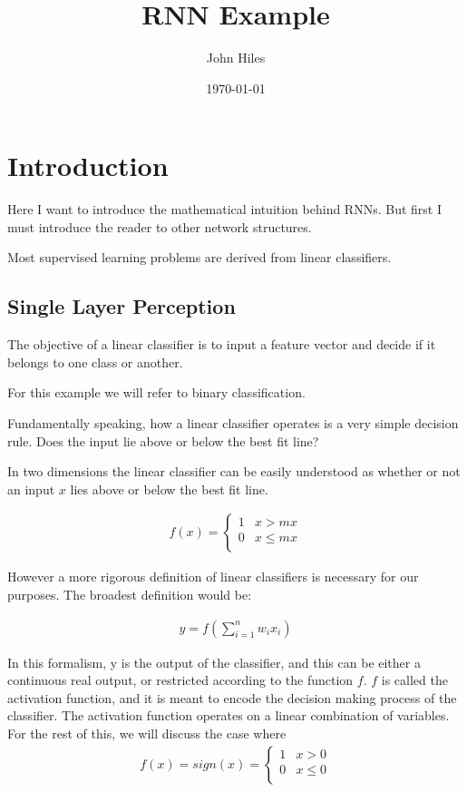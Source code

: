 \documentclass{article}
\title{RNN Example}
\author{John Hiles}
\date\today
\begin{document}
\maketitle %



\section{Introduction}

Here I want to introduce the mathematical intuition behind RNNs. But first I must introduce the reader to other network structures.

Most supervised learning problems are derived from linear classifiers.

\subsection*{Single Layer Perception}

The objective of a linear classifier is to input a feature vector and decide if it belongs to one class or another.

For this example we will refer to binary classification.

Fundamentally speaking, how a linear classifier operates is a very simple decision rule. Does the input lie above or below the best fit line?

In two dimensions the linear classifier can be easily understood as whether or not an input $x$ lies above or below the best fit line.

\begin{align*}
f(x) = 
 \begin{cases} 
      1 & x > mx \\
      0 & x \leq mx \\
   \end{cases}
\end{align*}

However a more rigorous definition of linear classifiers is necessary for our purposes. The broadest definition would be:

\begin{align*}
y = f(\sum_{i=1}^{n} w_i x_i)
\end{align*}

In this formalism, y is the output of the classifier, and this can be either a continuous real output, or restricted according to the function $f$. $f$ is called the activation function, and it is meant to encode the decision making process of the classifier. The activation function operates on a linear combination of variables. For the rest of this, we will discuss the case where
\begin{align*}
f(x) = sign(x) =
 \begin{cases} 
      1 & x > 0 \\
      0 & x \leq 0 \\
   \end{cases}
\end{align*}
\end{document}
